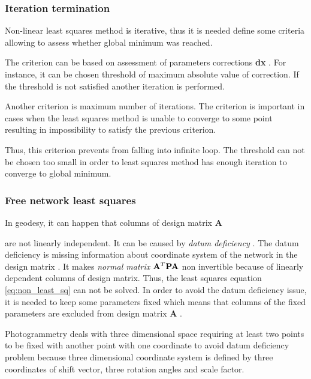\documentclass[a4paper,12pt]{article}
\newcommand{\ematr}[1]{%
{\bf #1}%
}
\newcommand{\evect}[1]{%
{\bf #1}%
}
\newcommand{\term}[1]{%
{\it #1}%
}
\begin{document}
\subsubsection{Iteration termination}
\label{sec:term_crit}
Non-linear least squares method is iterative, thus it is needed define 
some criteria allowing to assess whether global minimum was reached. 

The criterion \cite{mikhail1976observations} can be 
based on assessment of parameters corrections \evect{dx}. 
For instance, it can be chosen threshold of maximum absolute value
of correction. If the threshold is not satisfied another 
iteration is performed. 

Another criterion is maximum number of iterations.
The criterion is important in cases when the least squares method
is unable to converge to some point resulting 
in impossibility to satisfy the previous criterion.

Thus, this criterion prevents from falling into infinite loop.
The threshold can not be chosen too small in order to
least squares method has enough iteration to converge to
global minimum. 


\subsubsection{Free network least squares}
\label{sec:free_net_least}


In geodesy, it can happen that columns of design matrix \ematr{A}
are not linearly independent. It can be caused by \term{datum deficiency} \cite{deakin2006rank}. 
The datum deficiency is missing information
about  coordinate system of the network in the design matrix \cite{strang1997linear}.
It makes \term{normal matrix} $ \ematr{A}^{T} \ematr{P} \ematr{A}$ non invertible because 
of linearly dependent columns of design matrix. 
Thus,
the least squares equation \eqref{eq:non_least_sq} can not be solved.
In order to avoid the datum deficiency issue, it is needed to keep some parameters fixed
which means that columns of the fixed parameters are excluded from design matrix \ematr{A}.

Photogrammetry deals with three dimensional space requiring at least  
two points to be fixed with another point with one coordinate to avoid datum deficiency problem because
three dimensional coordinate system is defined by three coordinates of shift vector, three rotation angles and scale factor. 
\end{document}
